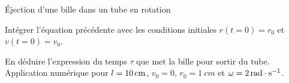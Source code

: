 \begin{exo}[PC][1][colle]{Éjection d'une bille dans un tube en rotation}
\begin{quest}
\item Intégrer l'équation précédente avec les conditions initiales $r(t=0)=r_{0}$ et $v(t=0)=v_{0}$.


\item En déduire l'expression du temps $\tau$ que met la bille pour sortir du tube. Application numérique pour $l=10\,\rm{cm}$, $v_{0}=0$, $r_0 = \SI{1}{cm}$ et $\omega=2\,\rm{rad}\cdot\rm{s}^{-1}$.


\end{quest}
\end{exo}

